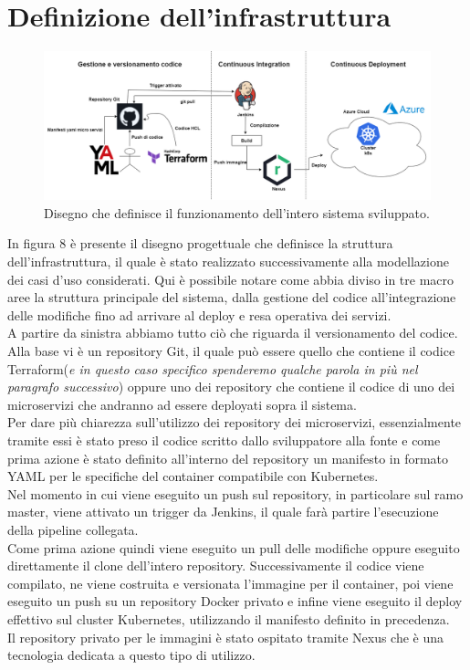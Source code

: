 \documentclass[a4paper,12pt]{report}
\begin{document}
\section{Definizione dell'infrastruttura}
\begin{figure}[h]
	\includegraphics[width=1.0\textwidth]{disegno_struttura_infra}
    \caption{Disegno che definisce il funzionamento dell'intero sistema sviluppato.}
    \label{fig:disegno_struttura_infra}
\end{figure}
In figura 8 è presente il disegno progettuale che definisce la struttura dell'infrastruttura, il quale è stato realizzato successivamente alla modellazione dei casi d'uso considerati. Qui è possibile notare come abbia diviso in tre macro aree la struttura principale del sistema, dalla gestione del codice all'integrazione delle modifiche fino ad arrivare al deploy e resa operativa dei servizi.\\
A partire da sinistra abbiamo tutto ciò che riguarda il versionamento del codice. Alla base vi è un repository Git, il quale può essere quello che contiene il codice Terraform(\textit{e in questo caso specifico spenderemo qualche parola in più nel paragrafo successivo}) oppure uno dei repository che contiene il codice di uno dei microservizi che andranno ad essere deployati sopra il sistema.\\
Per dare più chiarezza sull'utilizzo dei repository dei microservizi, essenzialmente tramite essi è stato preso il codice scritto dallo sviluppatore alla fonte e come prima azione è stato definito all'interno del repository un manifesto in formato YAML per le specifiche del container compatibile con Kubernetes.\\
Nel momento in cui viene eseguito un push sul repository, in particolare sul ramo master, viene attivato un trigger da Jenkins, il quale farà partire l'esecuzione della pipeline collegata.\\
Come prima azione quindi viene eseguito un pull delle modifiche oppure eseguito direttamente il clone dell'intero repository. Successivamente il codice viene compilato, ne viene costruita e versionata l'immagine per il container, poi viene eseguito un push su un repository Docker privato e infine viene eseguito il deploy effettivo sul cluster Kubernetes, utilizzando il manifesto definito in precedenza.\\
Il repository privato per le immagini è stato ospitato tramite Nexus che è una tecnologia dedicata a questo tipo di utilizzo.
\end{document}
